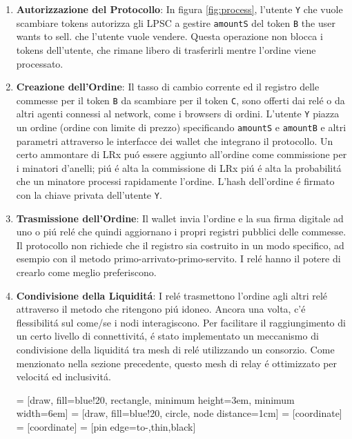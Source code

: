 \documentclass[UTF8,nofonts]{article}
\makeatletter
\newenvironment{figurehere}
 {\def\@captype{figure}}
 {}
\makeatother
\begin{document}
\begin{multicols}{2}
\begin{enumerate}


\item \textbf{Autorizzazione del Protocollo}: In figura \ref{fig:process}, l'utente \verb|Y| che vuole scambiare tokens autorizza gli LPSC a gestire \verb|amountS| del token \verb|B| the user wants to sell. che l'utente vuole vendere. Questa operazione non blocca i tokens dell'utente, che rimane libero di trasferirli mentre l'ordine viene processato.

\item \textbf{Creazione dell'Ordine}: Il tasso di cambio corrente ed il registro delle commesse per il token \verb|B| da scambiare per il token \verb|C|,  sono offerti dai rel\'e o da altri agenti connessi al network, come i browsers di ordini. L'utente \verb|Y| piazza un ordine (ordine con limite di prezzo) specificando \verb|amountS| e \verb|amountB| e altri parametri attraverso le interfacce dei wallet che integrano il protocollo. Un certo ammontare di LRx pu\'o essere aggiunto all'ordine come commissione per i minatori d'anelli; pi\'u \'e alta la commissione di LRx pi\'u \'e alta la probabilit\'a che un minatore processi rapidamente l'ordine. L'hash dell'ordine \'e firmato con la chiave privata dell'utente \verb|Y|.

\item \textbf{Trasmissione dell'Ordine}: Il wallet invia l'ordine e la sua firma digitale ad uno o pi\'u rel\'e che quindi aggiornano i propri registri pubblici delle commesse. Il protocollo non richiede che il registro sia costruito in un modo specifico, ad esempio con il metodo primo-arrivato-primo-servito. I rel\'e hanno il potere di crearlo come meglio preferiscono.

\item \textbf{Condivisione della Liquidit\'a}: I rel\'e trasmettono l'ordine agli altri rel\'e attraverso il metodo che ritengono pi\'u idoneo. Ancora una volta, c'\'e flessibilit\'a sul come/se i nodi interagiscono. Per facilitare il raggiungimento di un certo livello di connettivit\'a, \'e stato implementato un meccanismo di condivisione della liquidit\'a tra mesh di rel\'e utilizzando un consorzio. Come menzionato nella sezione precedente, questo mesh di relay \'e ottimizzato per velocit\'a ed inclusivit\'a.


\begin{center}
\begin{figurehere}
\centering
{} = [draw, fill=blue!20, rectangle,
    minimum height=3em, minimum width=6em]
 = [draw, fill=blue!20, circle, node distance=1cm]
 = [coordinate]
 = [coordinate]
 = [pin edge={to-,thin,black}]


\end{figurehere}
\end{center}
\end{enumerate}
\end{multicols}
\end{document}
